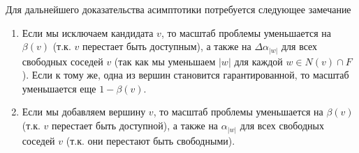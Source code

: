 Для дальнейшего доказательства асимптотики потребуется следующее замечание

\begin{note}\indent
    \begin{enumerate}
        \item Если мы исключаем кандидата \(v\), то масштаб проблемы уменьшается на \(\beta(v)\) (т.к. \(v\) перестает быть доступным), а также на \(\Delta\alpha_{|w|}\) для всех свободных соседей \(v\) (так как мы уменьшаем \(|w|\) для каждой \(w \in N(v) \cap F\)). Если к тому же, одна из вершин становится гарантированной, то масштаб уменьшается еще \(1 - \beta(v)\).
        \item Если мы добавляем вершину \(v\), то масштаб проблемы уменьшается на \(\beta(v)\) (т.к. \(v\) перестает быть доступной), а также на \(\alpha_{|w|}\) для всех свободных соседей \(v\) (т.к. они перестают быть свободными).
    \end{enumerate}
\end{note}

